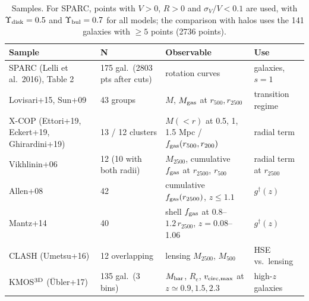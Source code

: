 \documentclass[11pt,a4paper]{article}
\newcommand{\gdag}{g^{\dagger}}
\newcommand{\fgas}{f_{\rm gas}}
\begin{document}
\begin{table}[h]
\centering\small
\begin{tabular}{p{4.1cm}p{3.0cm}p{4.9cm}p{2.2cm}}
\toprule
Sample & N & Observable & Use \\
\midrule
SPARC (Lelli et al.\ 2016), Table 2 & 175 gal.\ (2803 pts after cuts) & rotation curves & galaxies, $s=1$ \\
Lovisari+15, Sun+09 & 43 groups & $M$, $M_{\rm gas}$ at $r_{500},r_{2500}$ & transition regime \\
X-COP (Ettori+19, Eckert+19, Ghirardini+19) & 13 / 12 clusters & $M(<r)$ at 0.5, 1, 1.5 Mpc / $\fgas(r_{500},r_{200})$ & radial term \\
Vikhlinin+06 & 12 (10 with both radii) & $M_{2500}$, cumulative $\fgas$ at $r_{2500}$, $r_{500}$ & radial term at $r_{2500}$ \\
Allen+08 & 42 & cumulative $\fgas(r_{2500})$, $z\le1.1$ & $\gdag(z)$ \\
Mantz+14 & 40 & shell $\fgas$ at $0.8$--$1.2\,r_{2500}$, $z=0.08$--1.06 & $\gdag(z)$ \\
CLASH (Umetsu+16) & 12 overlapping & lensing $M_{2500}$, $M_{500}$ & HSE vs.\ lensing \\
KMOS$^{\rm 3D}$ (\"Ubler+17) & 135 gal.\ (3 bins) & $M_{\rm bar}$, $R_e$, $v_{\rm circ,max}$ at $z\simeq0.9,1.5,2.3$ & high-$z$ galaxies \\
\bottomrule
\end{tabular}
\caption{Samples. For SPARC, points with $V>0$, $R>0$ and $\sigma_V/V<0.1$ are used, with $\Upsilon_{\rm disk}=0.5$ and $\Upsilon_{\rm bul}=0.7$ for all models; the comparison with halos uses the 141 galaxies with $\ge5$ points (2736 points).}
\label{tab:samples}
\end{table}
\end{document}
